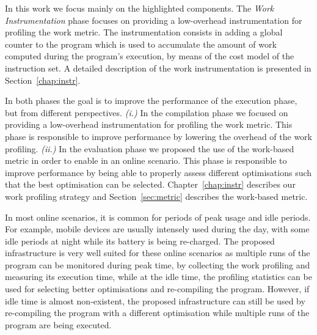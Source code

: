 In this work we focus mainly on the highlighted components.
The \textit{Work Instrumentation} phase focuses on providing a low-overhead instrumentation for profiling the work metric.
The instrumentation consists in adding a global counter to the program which is used to accumulate the amount of work computed during the program's execution, by means of the cost model of the instruction set.
A detailed description of the work instrumentation is presented in Section~\ref{chap:instr}.

In both phases the goal is to improve the performance of the execution phase, but from different perspectives.
\textit{(i.)} In the compilation phase we focused on providing a low-overhead instrumentation for profiling the work metric. This phase is responsible to improve performance by lowering the overhead of the work profiling.
\textit{(ii.)} In the evaluation phase we proposed the use of the work-based metric in order to enable {\itercomp} in an online scenario. This phase is responsible to improve performance by being able to properly assess different optimisations such that the best optimisation can be selected.
Chapter~\ref{chap:instr} describes our work profiling strategy and Section~\ref{sec:metric} describes the work-based metric.


In most online scenarios, it is common for periods of peak usage and idle periods.
For example, mobile devices are usually intensely used during the day, with some idle periods at night while its battery is being re-charged.
The proposed infrastructure is very well suited for these online scenarios as multiple runs of the program can be monitored during peak time, by collecting the work profiling and measuring its execution time, while at the idle time, the profiling statistics can be used for selecting better optimisations and re-compiling the program.
However, if idle time is almost non-existent, the proposed infrastructure can still be used by re-compiling the program with a different optimisation while multiple runs of the program are being executed.

